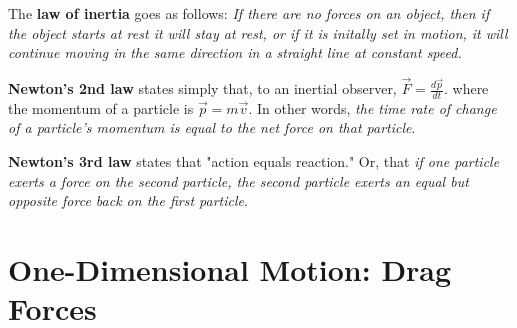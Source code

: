 \begin{definition}
    The \textbf{law of inertia} goes as follows: \emph{If there are no forces on an object, then if the object starts at rest it will stay at rest, or if it is initally set in motion, it will continue moving in the same direction in a straight line at constant speed.}
\end{definition}
\begin{definition}
    \textbf{Newton's 2nd law} states simply that, to an inertial observer, $\vec{F} = \frac{d\vec{p}}{dt}$. where the momentum of a particle is $\vec{p} = m\vec{v}$. In other words, \emph{the time rate of change of a particle's momentum is equal to the net force on that particle}.
\end{definition}
\begin{definition}
    \textbf{Newton's 3rd law} states that "action equals reaction." Or, that \emph{if one particle exerts a force on the second particle, the second particle exerts an equal but opposite force back on the first particle}.
\end{definition}

\section{One-Dimensional Motion: Drag Forces}

